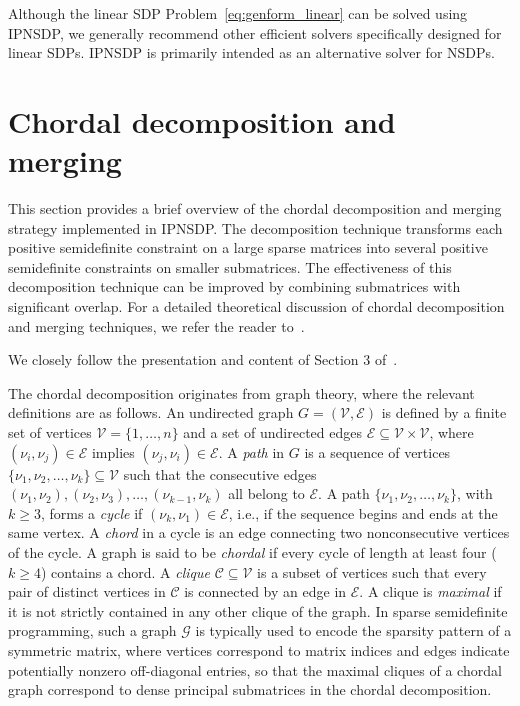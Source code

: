 \documentclass[]{interact}
\theoremstyle{plain}%
\theoremstyle{definition}
\theoremstyle{remark}
\begin{document}
Although the linear SDP Problem~\eqref{eq:genform_linear} can be solved using IPNSDP, we generally recommend  other efficient solvers specifically designed for linear SDPs. IPNSDP is primarily intended as an alternative solver for NSDPs. 

\section{Chordal decomposition and merging}\label{sec:chord_decomp}
This section provides a brief overview of the chordal decomposition and merging strategy implemented in IPNSDP. The decomposition technique transforms each positive semidefinite constraint on a large  sparse matrices into several positive semidefinite constraints on smaller submatrices. The  effectiveness of this decomposition technique can be improved by combining submatrices with significant overlap.  For a detailed theoretical discussion of chordal decomposition and merging techniques, we refer the reader to~\cite{Fukuda2001, KimKMY11, Lieven2015, ZHENG2021243,  GARSTKA2020}.

We closely follow the presentation and content of Section 3 of~\cite{Weldeyesus2024}.


The chordal decomposition originates from graph theory, where the relevant definitions are as follows. An undirected graph \( G = (\mathcal{V}, \mathcal{E}) \) is defined by a finite set of vertices \( \mathcal{V} = \{1, \dots, n\} \) and a set of undirected edges \( \mathcal{E} \subseteq \mathcal{V} \times \mathcal{V} \), where \( (\nu_i, \nu_j) \in \mathcal{E} \) implies \( (\nu_j, \nu_i) \in \mathcal{E} \). A \emph{path} in \( G \) is a sequence of vertices \( \{\nu_1, \nu_2, \dots, \nu_k\} \subseteq \mathcal{V} \) such that the consecutive edges \( (\nu_1, \nu_2), (\nu_2, \nu_3), \dots, (\nu_{k-1}, \nu_k) \) all belong to \( \mathcal{E} \). A path \( \{\nu_1, \nu_2, \dots, \nu_k\} \), with \( k \geq 3 \), forms a \emph{cycle} if \( (\nu_k, \nu_1) \in \mathcal{E} \), i.e., if the sequence begins and ends at the same vertex. A \emph{chord} in a cycle is an edge connecting two nonconsecutive vertices of the cycle. A graph is said to be \emph{chordal} if every cycle of length at least four (\( k \geq 4 \)) contains a chord. A \emph{clique} \( \mathcal{C} \subseteq \mathcal{V} \) is a subset of vertices such that every pair of distinct vertices in \( \mathcal{C} \) is connected by an edge in \( \mathcal{E} \). A clique is \emph{maximal} if it is not strictly contained in any other clique of the graph.  In sparse semidefinite programming, such a graph 
 \(\mathcal{G}\) is typically used to encode the sparsity pattern of a symmetric matrix, where vertices correspond to matrix indices and edges indicate potentially nonzero off-diagonal entries, so that the maximal cliques of a chordal graph correspond to dense principal submatrices in the chordal decomposition.
\end{document}
